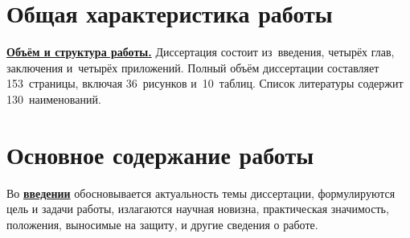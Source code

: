 \section*{Общая характеристика работы}

\newcommand{\actuality}{\pdfbookmark[1]{Актуальность}{actuality}\underline{\textbf{\actualityTXT}}}
\newcommand{\progress}{\pdfbookmark[1]{Разработанность темы}{progress}\underline{\textbf{\progressTXT}}}
\newcommand{\aim}{\pdfbookmark[1]{Цели}{aim}\underline{{\textbf\aimTXT}}}
\newcommand{\tasks}{\pdfbookmark[1]{Задачи}{tasks}\underline{\textbf{\tasksTXT}}}
\newcommand{\aimtasks}{\pdfbookmark[1]{Цели и задачи}{aimtasks}\aimtasksTXT}
\newcommand{\novelty}{\pdfbookmark[1]{Научная новизна}{novelty}\underline{\textbf{\noveltyTXT}}}
\newcommand{\influence}{\pdfbookmark[1]{Практическая значимость}{influence}\underline{\textbf{\influenceTXT}}}
\newcommand{\methods}{\pdfbookmark[1]{Методология и методы исследования}{methods}\underline{\textbf{\methodsTXT}}}
\newcommand{\defpositions}{\pdfbookmark[1]{Положения, выносимые на защиту}{defpositions}\underline{\textbf{\defpositionsTXT}}}
\newcommand{\reliability}{\pdfbookmark[1]{Достоверность}{reliability}\underline{\textbf{\reliabilityTXT}}}
\newcommand{\probation}{\pdfbookmark[1]{Апробация}{probation}\underline{\textbf{\probationTXT}}}
\newcommand{\contribution}{\pdfbookmark[1]{Личный вклад}{contribution}\underline{\textbf{\contributionTXT}}}
\newcommand{\publications}{\pdfbookmark[1]{Публикации}{publications}\underline{\textbf{\publicationsTXT}}}


\underline{\textbf{Объём и структура работы.}} Диссертация состоит из~введения, четырёх глав, заключения и~четырёх приложений. Полный объём диссертации составляет 153~страницы, включая 36~рисунков и~10~таблиц. Список литературы содержит 130~наименований.

\section*{Основное содержание работы}

Во \underline{\textbf{введении}} обосновывается актуальность темы диссертации, формулируются цель и задачи работы, излагаются научная новизна, практическая значимость, положения, выносимые на защиту, и другие сведения о работе.

